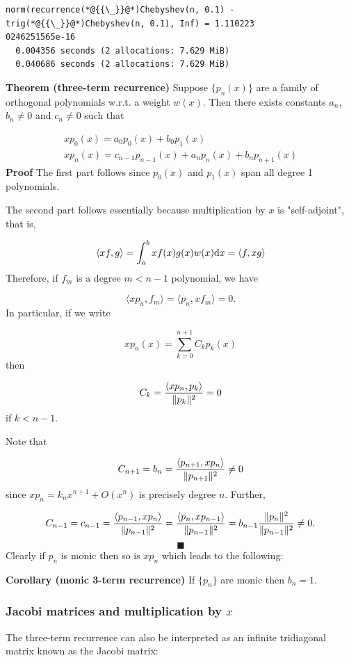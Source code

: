 \documentclass[12pt,a4paper]{article}
\begin{document}
\begin{lstlisting}
norm(recurrence(*@{{\_}}@*)Chebyshev(n, 0.1) - trig(*@{{\_}}@*)Chebyshev(n, 0.1), Inf) = 1.110223
0246251565e-16
  0.004356 seconds (2 allocations: 7.629 MiB)
  0.040686 seconds (2 allocations: 7.629 MiB)
\end{lstlisting}


\textbf{Theorem (three-term recurrence)} Suppose $\{p_n(x)\}$ are a family of orthogonal polynomials w.r.t. a weight $w(x)$. Then there exists constants $a_n$, $b_n \neq 0$ and $c_n \neq 0$ such that


\begin{align*}
x p_0(x) = a_0 p_0(x) + b_0 p_1(x) \\
x p_n(x) = c_{n-1} p_{n-1}(x) + a_n p_n(x) + b_n p_{n+1}(x)
\end{align*}
\textbf{Proof} The first part follows since $p_0(x)$ and $p_1(x)$ span all degree 1 polynomials.

The second part follows essentially because multiplication by $x$ is "self-adjoint", that is,

\[
\langle x f, g\rangle = \int_a^b x f(x) g(x) w(x) {\rm d}x = \langle f, x g \rangle
\]
Therefore, if $f_m$ is a degree $m < n-1$ polynomial, we have

\[
\langle x p_n, f_m\rangle = \langle p_n, x f_m\rangle = 0.
\]
In particular, if we write

\[
x p_n(x) = \sum_{k=0}^{n+1} C_k p_k(x)
\]
then

\[
C_k = {\langle x p_n, p_k\rangle \over \| p_k\|^2} = 0
\]
if $k < n-1$.

Note that

\[
C_{n+1} = b_n = {\ensuremath{\langle}p_{n+1}, x p_n\ensuremath{\rangle} \over \|p_{n+1} \|^2} \ensuremath{\ne} 0
\]
since $x p_n = k_n x^{n+1} + O(x^n)$ is precisely degree $n$. Further,

\[
C_{n-1} = c_{n-1} = {\ensuremath{\langle}p_{n-1}, x p_n\ensuremath{\rangle} \over \|p_{n-1}\|^2 } =
{\ensuremath{\langle}p_n, x p_{n-1}\ensuremath{\rangle}  \over \|p_{n-1}\|^2 } =  b_{n-1}{\|p_n\|^2  \over \|p_{n-1}\|^2 } \ensuremath{\ne} 0.
\]
\[
\blacksquare
\]
Clearly if $p_n$ is monic then so is $x p_n$ which leads to the following:

\textbf{Corollary (monic 3-term recurrence)} If $\{p_n\}$ are monic then $b_n =  1$.

\subsubsection{Jacobi matrices and multiplication by $x$}
The three-term recurrence can also be interpreted as an infinite tridiagonal matrix known as the Jacobi matrix:
\end{document}
